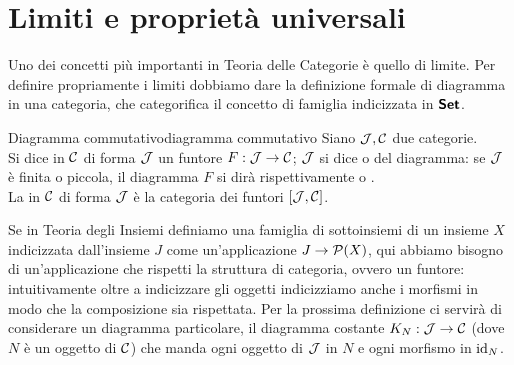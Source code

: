 \documentclass[openany]{book}
\renewcommand\C{\mc{C}}
\newcommand\J{\mc{J}}
\begin{document}
\newpage
\section{Limiti e proprietà universali}

Uno dei concetti più importanti in Teoria delle Categorie è quello di limite. Per definire propriamente i limiti dobbiamo dare la definizione formale di diagramma in una categoria, che categorifica il concetto di famiglia indicizzata in $\text{\sffamily\textbf{Set}}$.

\begin{definition}{Diagramma commutativo}{diagramma commutativo}
    Siano $\J, \C$ due categorie.\\
    Si dice  in $\C$ di forma $\J$ un funtore $F:\J\to\C$; $\J$ si dice  o  del diagramma: se $\J$ è finita o piccola, il diagramma $F$ si dirà rispettivamente  o .\\
    La  in $\C$ di forma $\J$ è la categoria dei funtori $[\J,\C]$.
\end{definition}

Se in Teoria degli Insiemi definiamo una famiglia di sottoinsiemi di un insieme $X$ indicizzata dall'insieme $J$ come un'applicazione $J\to \mathcal{P}(X)$, qui abbiamo bisogno di un'applicazione che rispetti la struttura di categoria, ovvero un funtore: intuitivamente oltre a indicizzare gli oggetti indicizziamo anche i morfismi in modo che la composizione sia rispettata. Per la prossima definizione ci servirà di considerare un diagramma particolare, il diagramma costante $K_N : \J\to \C$ (dove $N$ è un oggetto di $\C$) che manda ogni oggetto di $\J$ in $N$ e ogni morfismo in $\operatorname{id}_N$.
\end{document}
